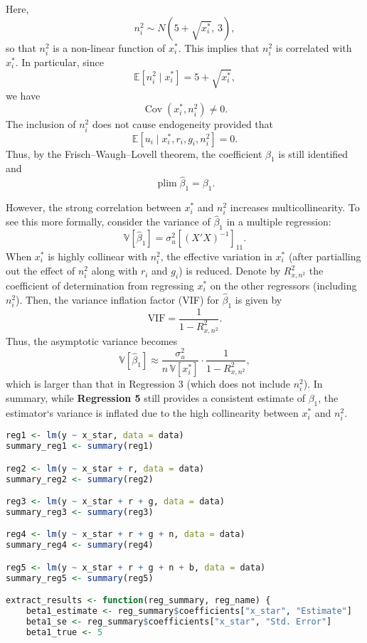 \documentclass[a4paper,12pt]{article} %
\theoremstyle{nonitalic}
\newenvironment{solution}[1]
  {\renewcommand\theinnercustomsol{#1}\innercustomsol}
  {\endinnercustomsol}
\newcounter{solutionctr}
\renewcommand{\thesolutionctr}{(\alph{solutionctr})}
\newenvironment{autosolution}
  {\stepcounter{solutionctr}\begin{solution}{\thesolutionctr}}
  {\end{solution}}
\begin{document}
\begin{autosolution}
Here,
\[
n_i^2 \sim N\left(5+\sqrt{x_i^*},\,3\right),
\]
so that $n_i^2$ is a non-linear function of $x_i^*$. 
This implies that $n_i^2$ is correlated with $x_i^*$. 
In particular, since
\[
\mathbb{E}[n_i^2\mid x_i^*] = 5 + \sqrt{x_i^*},
\]
we have
\[
\operatorname{Cov}(x_i^*, n_i^2) \neq 0.
\]
The inclusion of $n_i^2$ does not cause endogeneity provided that 
\[
\mathbb{E}[u_i \mid x_i^*, r_i, g_i, n_i^2] = 0.
\]
Thus, by the Frisch--Waugh--Lovell theorem, 
the coefficient $\beta_1$ is still identified and
\[
\operatorname*{plim}\hat{\beta}_1 = \beta_1.
\]

However, the strong correlation between $x_i^*$ and $n_i^2$ increases multicollinearity. 
To see this more formally, consider the variance of $\hat{\beta}_1$ in a multiple regression:
\[
\mathbb{V}[\hat{\beta}_1] = \sigma_u^2 \left[(X'X)^{-1}\right]_{11}.
\]
When $x_i^*$ is highly collinear with $n_i^2$, 
the effective variation in $x_i^*$ 
(after partialling out the effect of $n_i^2$ along with $r_i$ and $g_i$) 
is reduced. 
Denote by $R^2_{x,n^2}$ the coefficient of determination from 
regressing $x_i^*$ on the other regressors (including $n_i^2$). 
Then, the variance inflation factor (VIF) for $\hat{\beta}_1$ is given by
\[
\text{VIF} = \frac{1}{1-R^2_{x,n^2}}.
\]
Thus, the asymptotic variance becomes
\[
\mathbb{V}[\hat{\beta}_1] \approx \frac{\sigma_u^2}{n\,\mathbb{V}[x_i^*]}\cdot \frac{1}{1-R^2_{x,n^2}},
\]
which is larger than that in Regression 3 
(which does not include $n_i^2$). 
In summary, while \textbf{Regression 5} still provides a consistent estimate of $\beta_1$, 
the estimator`s variance is inflated due to the high collinearity between $x_i^*$ and $n_i^2$.


\begin{lstlisting}[language=R]
reg1 <- lm(y ~ x_star, data = data)
summary_reg1 <- summary(reg1)

reg2 <- lm(y ~ x_star + r, data = data)
summary_reg2 <- summary(reg2)

reg3 <- lm(y ~ x_star + r + g, data = data)
summary_reg3 <- summary(reg3)

reg4 <- lm(y ~ x_star + r + g + n, data = data)
summary_reg4 <- summary(reg4)

reg5 <- lm(y ~ x_star + r + g + n + b, data = data)
summary_reg5 <- summary(reg5)

extract_results <- function(reg_summary, reg_name) {
    beta1_estimate <- reg_summary$coefficients["x_star", "Estimate"]
    beta1_se <- reg_summary$coefficients["x_star", "Std. Error"]
    beta1_true <- 5
    

\end{lstlisting}
\end{autosolution}
\end{document}
